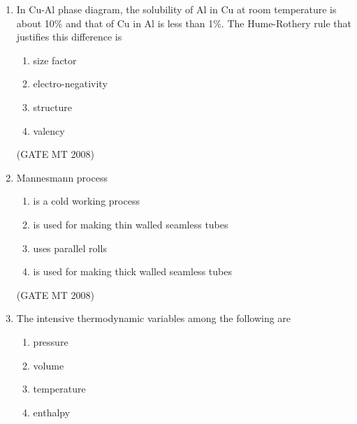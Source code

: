 \documentclass[11pt, letterpaper]{article}
\theoremstyle{remark}
\begin{document}
\begin{enumerate}
\begin{multicols}{4}
\begin{enumerate}
\item 2
\item 3 
\item 4
\item 5
\end{enumerate}
\end{multicols}

\hfill(GATE MT 2008)

\item In Cu-Al phase diagram, the solubility of Al in Cu at room temperature is about 10\% and that of Cu in Al is less than 1\%. The Hume-Rothery rule that justifies this difference is

\begin{multicols}{2}
\begin{enumerate}
\item size factor
\item electro-negativity
\item structure
\item valency
\end{enumerate}
\end{multicols}

\hfill(GATE MT 2008)

\item Mannesmann process

\begin{multicols}{1}
\begin{enumerate}
\item is a cold working process
\item is used for making thin walled seamless tubes 
\item uses parallel rolls
\item is used for making thick walled seamless tubes
\end{enumerate}
\end{multicols}

\hfill(GATE MT 2008)

\item The intensive thermodynamic variables among the following are

\begin{multicols}{4}
\begin{enumerate}
\item pressure
\item volume 
\item temperature
\item enthalpy
\end{enumerate}
\end{multicols}


\end{enumerate}
\end{document}
